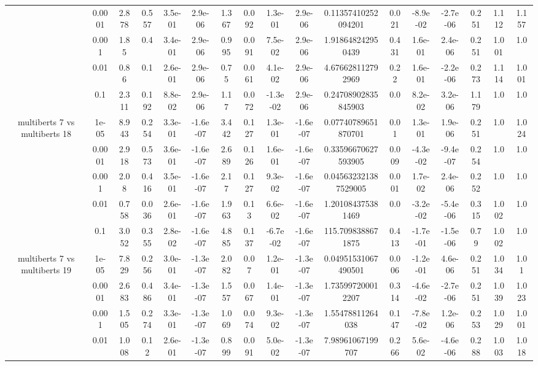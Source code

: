 \begin{tabular}{|c|c|c|c|c|c|c|c|c|c|c|c|c|c|c|c|c|}
 & 0.0001 & 2.878 & 0.557 & 3.5e-01 & 2.9e-06 & 1.367 & 0.092 & 1.3e-01 & 2.9e-06 & 0.11357410252094201 & 0.021 & -8.9e-02 & -2.7e-06 & 0.251 & 1.112 & 1.157 \\
 & 0.001 & 1.85 & 0.4 & 3.4e-01 & 2.9e-06 & 0.995 & 0.091 & 7.5e-02 & 2.9e-06 & 1.918648242950439 & 0.431 & 1.6e-01 & 2.4e-06 & 0.251 & 1.001 & 1.0 \\
 & 0.01 & 0.86 & 0.1 & 2.6e-01 & 2.9e-06 & 0.75 & 0.061 & 4.1e-02 & 2.9e-06 & 4.676628112792969 & 0.22 & 1.6e-01 & -2.2e-06 & 0.273 & 1.114 & 1.001 \\
 & 0.1 & 2.311 & 0.192 & 8.8e-02 & 2.9e-06 & 1.17 & 0.072 & -1.3e-02 & 2.9e-06 & 0.24708902835845903 & 0.0 & 8.2e-02 & 3.2e-06 & 1.179 & 1.0 & 1.0 \\
\hline
\multirow{5}{*}{multiberts 7 vs multiberts 18} & 1e-05 & 8.943 & 0.254 & 3.3e-01 & -1.6e-07 & 3.442 & 0.127 & 1.3e-01 & -1.6e-07 & 0.07740789651870701 & 0.01 & 1.3e-01 & 1.9e-06 & 0.251 & 1.0 & 1.024 \\
 & 0.0001 & 2.918 & 0.573 & 3.6e-01 & -1.6e-07 & 2.689 & 0.126 & 1.6e-01 & -1.6e-07 & 0.33596670627593905 & 0.009 & -4.3e-02 & -9.4e-07 & 0.254 & 1.0 & 1.0 \\
 & 0.001 & 2.08 & 0.416 & 3.5e-01 & -1.6e-07 & 2.17 & 0.127 & 9.3e-02 & -1.6e-07 & 0.045632321387529005 & 0.001 & 1.7e-02 & 2.4e-06 & 0.252 & 1.0 & 1.0 \\
 & 0.01 & 0.758 & 0.036 & 2.6e-01 & -1.6e-07 & 1.963 & 0.13 & 6.6e-02 & -1.6e-07 & 1.201084375381469 & 0.0 & -3.2e-02 & -5.4e-06 & 0.315 & 1.002 & 1.0 \\
 & 0.1 & 3.052 & 0.355 & 2.8e-02 & -1.6e-07 & 4.885 & 0.137 & -6.7e-02 & -1.6e-07 & 115.7098388671875 & 0.413 & -1.7e-01 & -1.5e-06 & 0.79 & 1.002 & 1.0 \\
\hline
\multirow{5}{*}{multiberts 7 vs multiberts 19} & 1e-05 & 7.829 & 0.256 & 3.0e-01 & -1.3e-07 & 2.082 & 0.07 & 1.2e-01 & -1.3e-07 & 0.04951531067490501 & 0.006 & -1.2e-01 & 4.6e-06 & 0.251 & 1.034 & 1.01 \\
 & 0.0001 & 2.683 & 0.486 & 3.4e-01 & -1.3e-07 & 1.557 & 0.067 & 1.4e-01 & -1.3e-07 & 1.735997200012207 & 0.314 & -4.6e-02 & -2.7e-06 & 0.251 & 1.039 & 1.023 \\
 & 0.001 & 1.505 & 0.274 & 3.3e-01 & -1.3e-07 & 1.069 & 0.074 & 9.3e-02 & -1.3e-07 & 1.55478811264038 & 0.147 & -7.8e-02 & 1.2e-06 & 0.253 & 1.029 & 1.001 \\
 & 0.01 & 1.008 & 0.12 & 2.6e-01 & -1.3e-07 & 0.899 & 0.091 & 5.0e-02 & -1.3e-07 & 7.98961067199707 & 0.266 & 5.6e-02 & -4.6e-06 & 0.288 & 1.003 & 1.018 \\

\end{tabular}
